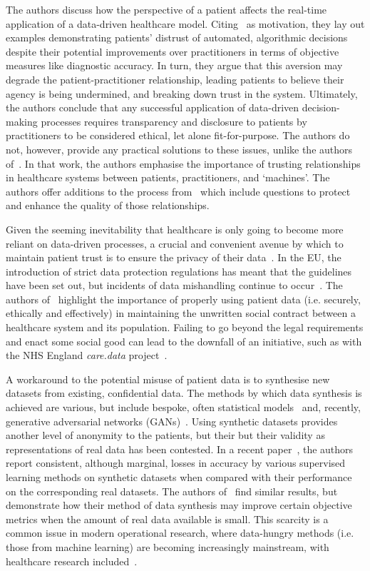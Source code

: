 The authors discuss how the perspective of a patient affects the real-time
application of a data-driven healthcare model. Citing~\cite{Dietvorst2015} as
motivation, they lay out examples demonstrating patients' distrust of automated,
algorithmic decisions despite their potential improvements over practitioners in
terms of objective measures like diagnostic accuracy. In turn, they argue that
this aversion may degrade the patient-practitioner relationship, leading
patients to believe their agency is being undermined, and breaking down trust in
the system. Ultimately, the authors conclude that any successful application of
data-driven decision-making processes requires transparency and disclosure to
patients by practitioners to be considered ethical, let alone fit-for-purpose.
The authors do not, however, provide any practical solutions to these issues,
unlike the authors of~\cite{Kraft2020}. In that work, the authors emphasise the
importance of trusting relationships in healthcare systems between patients,
practitioners, and `machines'. The authors offer additions to the process
from~\cite{Char2020} which include questions to protect and enhance the quality
of those relationships.

Given the seeming inevitability that healthcare is only going to become more
reliant on data-driven processes, a crucial and convenient avenue by which to
maintain patient trust is to ensure the privacy of their
data~\cite{Iott2019,vanStaa2016}. In the EU, the introduction of strict data
protection regulations has meant that the guidelines have been set out, but
incidents of data mishandling continue to occur~\cite{bbc2017,edpb2020}. The
authors of~\cite{Horn2020} highlight the importance of properly using patient
data (i.e. securely, ethically and effectively) in maintaining the unwritten
social contract between a healthcare system and its population. Failing to go
beyond the legal requirements and enact some social good can lead to the
downfall of an initiative, such as with the NHS England \emph{care.data}
project~\cite{Carter2015}.

A workaround to the potential misuse of patient data is to synthesise new
datasets from existing, confidential data. The methods by which data synthesis
is achieved are various, but include bespoke, often statistical
models~\cite{Dahmen2019,Dube2014,McLachlan2016,Tucker2020} and, recently,
generative adversarial networks (GANs)~\cite{Avino2018,Torfi2020}. Using
synthetic datasets provides another level of anonymity to the patients, but
their but their validity as representations of real data has been contested. In
a recent paper~\cite{Rankin2020}, the authors report consistent, although
marginal, losses in accuracy by various supervised learning methods on synthetic
datasets when compared with their performance on the corresponding real
datasets. The authors of~\cite{Dahmen2019} find similar results, but demonstrate
how their method of data synthesis may improve certain objective metrics when
the amount of real data available is small. This scarcity is a common issue in
modern operational research, where data-hungry methods (i.e. those from machine
learning) are becoming increasingly mainstream, with healthcare research
included~\cite{Panch2019}.

